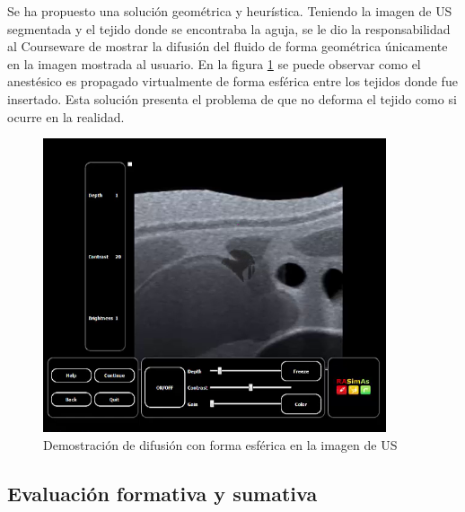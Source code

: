 
Se ha propuesto una solución geométrica y heurística. Teniendo la imagen de \ac{US} segmentada y el tejido donde se encontraba la aguja, se le dio la responsabilidad al \ac{Courseware} de mostrar la difusión del fluido de forma geométrica únicamente en la imagen mostrada al usuario. En la figura \ref{fig:spread2} se puede observar como el anestésico es propagado virtualmente de forma esférica entre los tejidos donde fue insertado. Esta solución presenta el problema de que no deforma el tejido como si ocurre en la realidad.

\begin{figure}[h]
    \centering
    \includegraphics[width=0.9\textwidth]{IMG/difussion.png}
    \caption{Demostración de difusión con forma esférica en la imagen de \ac{US}}
    \label{fig:spread2}
\end{figure}

 



\subsection{Evaluación formativa y sumativa}
\label{course:feedback}

